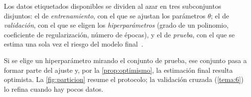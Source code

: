 \begin{definicion}
Los datos etiquetados disponibles se dividen al azar en tres subconjuntos disjuntos: el de \emph{entrenamiento}, con el que se ajustan los parámetros $\theta$; el de \emph{validación}, con el que se eligen los \emph{hiperparámetros} (grado de un polinomio, coeficiente de regularización, número de épocas), y el de \emph{prueba}, con el que se estima una sola vez el riesgo del modelo final~\cite[§2.8]{mit6390}.
\end{definicion}

Si se elige un hiperparámetro mirando el conjunto de prueba, ese conjunto pasa a formar parte del ajuste y, por la \cref{prop:optimismo}, la estimación final resulta optimista. La \cref{fig:particion} resume el protocolo; la validación cruzada (\cref{tema:6}) lo refina cuando hay pocos datos.

\addtocounter{figure}{1}%

\addtocounter{definicion}{1}%

